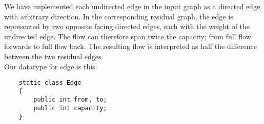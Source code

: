 \documentclass{article}
\begin{document}
  We have implemented each undirected edge in the input graph as a directed edge with arbitrary direction.
  In the corresponding residual graph, the edge is represented by two opposite facing directed edges, each with the weight of the undirected edge. The flow can therefore span twice the capacity; from full flow forwards to full flow back. The resulting flow is interpreted as half the difference between the two residual edges.\\
  Our datatype for edge is this:
  
  \begin{verbatim}
    static class Edge
   	{
   	    public int from, to;
   	    public int capacity;
   	}
  \end{verbatim}
\end{document}
